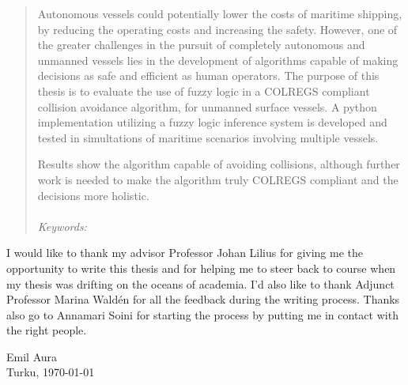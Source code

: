\documentclass[
12pt, %
oneside, %
english, %
onehalfspacing, %
nolistspacing, %
chapterinoneline, %
]{MastersDoctoralThesis} %
\begin{document}
\begin{abstract}
    \addchaptertocentry{\abstractname} %
    Autonomous vessels could potentially  lower the costs of maritime shipping, by reducing the operating costs and increasing the safety.
    However, one of the greater challenges in the pursuit of completely autonomous and unmanned vessels lies in  the development of algorithms capable of making decisions as safe and efficient as human operators.
    The purpose of this thesis is to evaluate the use of fuzzy logic in a COLREGS compliant collision avoidance algorithm, for unmanned surface vessels. A python implementation utilizing a fuzzy logic inference system is developed and tested in simultations of maritime scenarios involving multiple vessels.

    Results show the algorithm capable of avoiding collisions, although further work is needed to make the algorithm truly COLREGS compliant and the decisions more holistic.
    \\\\
    \textit{Keywords:} \textit{\keywordnames}
\end{abstract}


\begin{acknowledgements}


    \addchaptertocentry{\acknowledgementname} %
    I would like to thank my advisor Professor Johan Lilius for giving me the opportunity to write this thesis and for helping me to steer back to course when my thesis was drifting on the oceans of academia. I'd also like to thank Adjunct Professor Marina Waldén for all the feedback during the writing process. Thanks also go to Annamari Soini for starting the process by putting me in contact with the right people.

    \vspace{2cm}

    \noindent Emil Aura\\
    Turku, \today

\end{acknowledgements}
\end{document}

